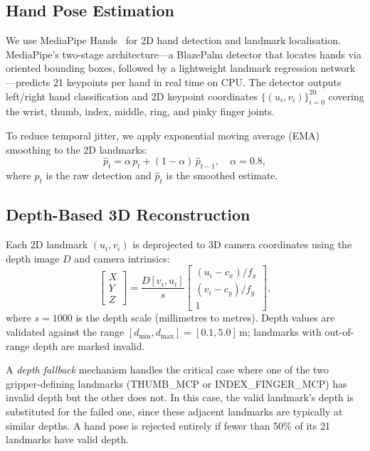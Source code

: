 \documentclass[10pt,journal]{IEEEtran}
\begin{document}
\subsection{Hand Pose Estimation}
\label{sec:handpose}

We use MediaPipe Hands~\cite{zhang2020mediapipe} for 2D hand detection
and landmark localisation. MediaPipe's two-stage architecture---a
BlazePalm detector that locates hands via oriented bounding boxes,
followed by a lightweight landmark regression network---predicts
21 keypoints per hand in real time on CPU. The detector outputs
left/right hand classification and 2D keypoint coordinates
$\{(u_i, v_i)\}_{i=0}^{20}$ covering the wrist, thumb, index, middle,
ring, and pinky finger joints.

To reduce temporal jitter, we apply exponential moving average (EMA)
smoothing to the 2D landmarks:
\begin{equation}\label{eq:ema}
  \hat{p}_t = \alpha\, p_t + (1 - \alpha)\, \hat{p}_{t-1},
  \quad \alpha = 0.8,
\end{equation}
where $p_t$ is the raw detection and $\hat{p}_t$ is the smoothed
estimate.

\subsection{Depth-Based 3D Reconstruction}
\label{sec:depth3d}

Each 2D landmark $(u_i, v_i)$ is deprojected to 3D camera coordinates
using the depth image $D$ and camera intrinsics:
\begin{equation}\label{eq:deproject}
  \begin{bmatrix} X \\ Y \\ Z \end{bmatrix}
  = \frac{D[v_i, u_i]}{s}
    \begin{bmatrix}
      (u_i - c_x) / f_x \\
      (v_i - c_y) / f_y \\
      1
    \end{bmatrix},
\end{equation}
where $s = 1000$ is the depth scale (millimetres to metres). Depth
values are validated against the range $[d_{\min}, d_{\max}] =
[0.1, 5.0]$\,m; landmarks with out-of-range depth are marked invalid.

A \emph{depth fallback} mechanism handles the critical case where one of
the two gripper-defining landmarks (THUMB\_MCP or INDEX\_FINGER\_MCP)
has invalid depth but the other does not. In this case, the valid
landmark's depth is substituted for the failed one, since these adjacent
landmarks are typically at similar depths. A hand pose is rejected
entirely if fewer than 50\% of its 21 landmarks have valid depth.
\end{document}
